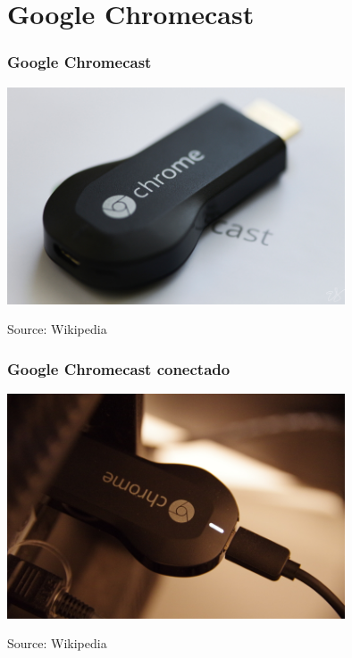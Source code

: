 
\section{Google Chromecast}


\begin{frame}
\frametitle{Google Chromecast}

\begin{center}
  \includegraphics[width=10cm]{figs/chromecast.jpg}
\end{center}


\begin{flushright}
{\tiny
Source: Wikipedia
}
\end{flushright}

\end{frame}




\begin{frame}
\frametitle{Google Chromecast conectado}

\begin{center}
  \includegraphics[width=10cm]{figs/enlatele.jpg}
\end{center}


\begin{flushright}
{\tiny
Source: Wikipedia
}
\end{flushright}

\end{frame}



